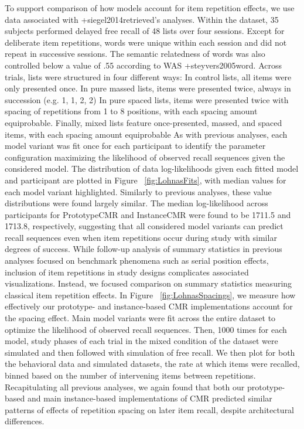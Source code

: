\markdownRendererInterblockSeparator
{}To support comparison of how models account for item repetition effects, we use data associated with +{}{}{siegel2014retrieved}'s analyses. Within the dataset, 35 subjects performed delayed free recall of 48 lists over four sessions. Except for deliberate item repetitions, words were unique within each session and did not repeat in successive sessions. The semantic relatedness of words was also controlled below a value of .55 according to WAS +{}{}{steyvers2005word}. Across trials, lists were structured in four different ways:\markdownRendererInterblockSeparator
{}\markdownRendererOlBegin
{}In control lists, all items were only presented once.\markdownRendererOlItemEnd 
{}In pure massed lists, items were presented twice, always in succession (e.g. 1, 1, 2, 2)\markdownRendererOlItemEnd 
{}In pure spaced lists, items were presented twice with spacing of repetitions from 1 to 8 positions, with each spacing amount equiprobable.\markdownRendererOlItemEnd 
{}Finally, mixed lists feature once-presented, massed, and spaced items, with each spacing amount equiprobable\markdownRendererOlItemEnd 
\markdownRendererOlEnd \markdownRendererInterblockSeparator
{}As with previous analyses, each model variant was fit once for each participant to identify the parameter configuration maximizing the likelihood of observed recall sequences given the considered model. The distribution of data log-likelihoods given each fitted model and participant are plotted in Figure ~\ref{fig:LohnasFits}, with median values for each model variant highlighted. Similarly to previous analyses, these value distributions were found largely similar. The median log-likelihood across participants for PrototypeCMR and InstanceCMR were found to be 1711.5 and 1713.8, respectively, suggesting that all considered model variants can predict recall sequences even when item repetitions occur during study with similar degrees of success.\markdownRendererInterblockSeparator
{}While follow-up analysis of summary statistics in previous analyses focused on benchmark phenomena such as serial position effects, inclusion of item repetitions in study designs complicates associated visualizations. Instead, we focused comparison on summary statistics measuring classical item repetition effects. In Figure ~\ref{fig:LohnasSpacings}, we measure how effectively our prototype- and instance-based CMR implementations account for the spacing effect. Main model variants were fit across the entire dataset to optimize the likelihood of observed recall sequences. Then, 1000 times for each model, study phases of each trial in the mixed condition of the dataset were simulated and then followed with simulation of free recall. We then plot for both the behavioral data and simulated datasets, the rate at which items were recalled, binned based on the number of intervening items between repetitions. Recapitulating all previous analyses, we again found that both our prototype-based and main instance-based implementations of CMR predicted similar patterns of effects of repetition spacing on later item recall, despite architectural differences.\relax
